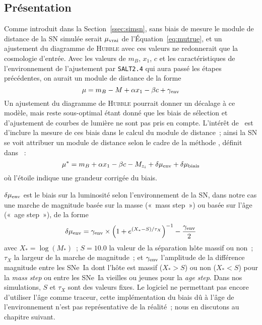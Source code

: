 \documentclass[../main/main.tex]{subfiles}
\begin{document}
\subsection{Présentation}\label{ssec:bbcintro}

Comme introduit dans la Section~\ref{ssec:simsn}, sans biais de mesure le module
de distance de la SN simulée serait $\mu_{\rm vrai}$ de
l'Équation~\ref{eq:mutrue}, et un ajustement du diagramme de \textsc{Hubble}
avec ces valeurs ne redonnerait que la cosmologie d'entrée. Avec les valeurs de
$m_B$, $x_1$, $c$ et les caractéristiques de l'environnement de l'ajustement par
\texttt{SALT2.4} qui aura passé les étapes précédentes, on aurait un module de
distance de la forme
\begin{equation}\label{eq:mu}
    \mu = m_B - M + \alpha x_1 - \beta c + \gamma_{\rm env}
\end{equation}
Un ajustement du diagramme de \textsc{Hubble} pourrait donner un décalage à ce
modèle, mais reste sous-optimal étant donné que les biais de sélection et
d'ajustement de courbes de lumière ne sont pas pris en compte. L'intérêt de
\bbc\ est d'inclure la mesure de ces biais dans le calcul du module de
distance~; ainsi la SN se voit attribuer un module de distance selon le cadre de
la méthode \bbc, définit dans \citep{popovic2021a}~:
\begin{equation}\label{eq:mucorr}
    \mu^* = m_B + \alpha x_1 - \beta c - M_{z_i} + \delta\mu_{\rm env} +
    \delta\mu_{\rm biais}
\end{equation}
où l'étoile indique une grandeur corrigée du biais.

$\delta\mu_{\rm env}$ est le biais sur la luminosité selon l'environnement de la
SN, dans notre cas une marche de magnitude basée sur la masse («~mass step~») ou
basée sur l'âge («~age step~»), de la forme
\begin{equation}
    \delta\mu_{\rm env} = \gamma_{\rm env}\times \left(1 + e^{(X_*-S)/\tau_X}
    \right)^{-1} - \frac{\gamma_{\rm env}}{2}
\end{equation}
avec $X_* = \log(M_*)$~; $S = \num{10.0}$ la valeur de la séparation hôte massif
ou non~; $\tau_X$ la largeur de la marche de magnitude~; et $\gamma_{\rm env}$
l'amplitude de la différence magnitude entre les SNe~Ia dont l'hôte est massif
($X_* > S$) ou non ($X_* < S$) pour la \textit{mass step} ou entre les SNe~Ia
vieilles ou jeunes pour la \textit{age step}. Dans nos simulations, $S$ et
$\tau_X$ sont des valeurs fixes. Le logiciel ne permettant pas encore d'utiliser
l'âge comme traceur, cette implémentation du biais dû à l'âge de l'environnement
n'est pas représentative de la réalité~; nous en discutons au chapitre suivant. 
\end{document}
